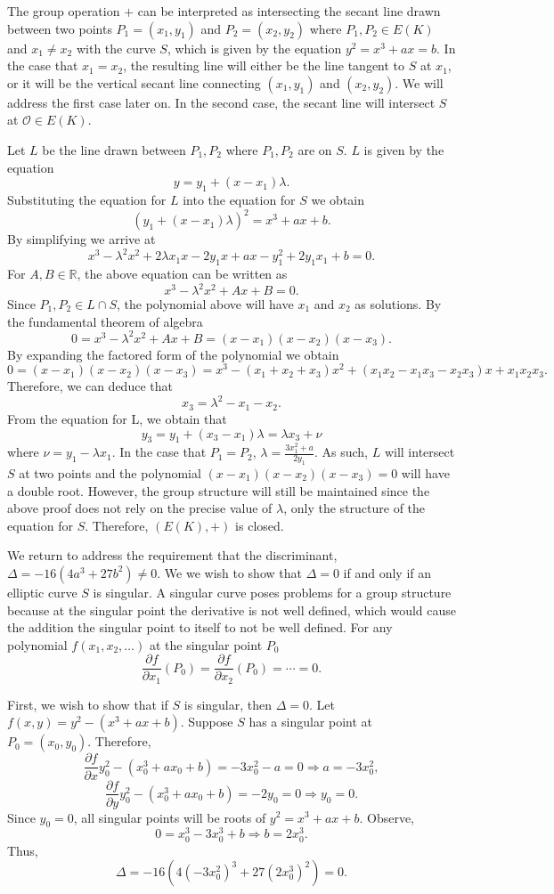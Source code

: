 \documentclass{article}
\begin{document}
\indent The group operation $+$ can be interpreted as intersecting the secant line drawn between two points $P_1=(x_1,y_1)$ and $P_2=(x_2,y_2)$ where $P_1,P_2 \in E(K)$ and $x_1 \neq x_2$ with the curve $S$, which is given by the equation $y^2=x^3+ax=b$. In the case that $x_1=x_2$, the resulting line will either be the line tangent to $S$ at $x_1$, or it will be the vertical secant line connecting $(x_1,y_1)$ and $(x_2,y_2)$. We will address the first case later on. In the second case, the secant line will intersect $S$ at $\mathcal{O} \in E(K)$.

\indent Let $L$ be the line drawn between $P_1,P_2$ where $P_1,P_2$ are on $S$. $L$ is given by the equation
$$y=y_1+(x-x_1)\lambda.$$
Substituting the equation for $L$ into the equation for $S$ we obtain
$$(y_1+(x-x_1)\lambda)^2=x^3+ax+b.$$
By simplifying we arrive at
$$x^3-\lambda^2 x^2+2\lambda x_1x-2y_1x+ax-y_1^2+2y_1x_1+b=0.$$
For $A,B\in\mathbb{R}$, the above equation can be written as
$$x^3-\lambda^2 x^2+Ax+B=0.$$
Since $P_1,P_2 \in L \cap S$, the polynomial above will have $x_1$ and $x_2$ as solutions. By the fundamental theorem of algebra
$$0=x^3-\lambda^2 x^2+Ax+B=(x-x_1)(x-x_2)(x-x_3).$$
By expanding the factored form of the polynomial we obtain
$$0=(x-x_1)(x-x_2)(x-x_3)=x^3-(x_1+x_2+x_3)x^2+(x_1x_2-x_1x_3-x_2x_3)x+x_1x_2x_3.$$
Therefore, we can deduce that
$$x_3=\lambda^2-x_1-x_2.$$
From the equation for L, we obtain that
$$y_3=y_1+(x_3-x_1)\lambda=\lambda x_3+\nu$$
where $\nu=y_1-\lambda x_1$. In the case that $P_1=P_2$, $\lambda=\frac{3x_1^2+a}{2y_1}$. As such, $L$ will intersect $S$ at two points and the polynomial $(x-x_1)(x-x_2)(x-x_3)=0$ will have a double root. However, the group structure will still be maintained since the above proof does not rely on the precise value of  $\lambda$, only the structure of the equation for $S$. Therefore, $(E(K),+)$ is closed.

\indent We return to address the requirement that the discriminant, $\Delta=-16(4a^3+27b^2) \neq 0$. We we wish to show that $\Delta=0$ if and only if an elliptic curve $S$ is singular. A singular curve poses problems for a group structure because at the singular point the derivative is not well defined, which would cause the addition the singular point to itself to not be well defined. For any polynomial $f(x_1,x_2,\dotsc)$ at the singular point $P_0$
$$\frac{\partial f}{\partial x_1}(P_0)=\frac{\partial f}{\partial x_2}(P_0)=\cdots=0.$$

\indent First, we wish to show that if $S$ is singular, then $\Delta=0$.
Let $f(x,y)=y^2-(x^3+ax+b)$. Suppose $S$ has a singular point at $P_0=(x_0, y_0)$. Therefore,
$$\frac{\partial f}{\partial x} y_0^2-(x_0^3+ax_0+b)=-3x_0^2-a=0 \Longrightarrow a=-3x_0^2,$$
$$\frac{\partial f}{\partial y} y_0^2-(x_0^3+ax_0+b)=-2y_0=0 \Longrightarrow y_0=0.$$
Since $y_0=0$, all singular points will be roots of $y^2=x^3+ax+b$. Observe,
$$0=x_0^3-3x_0^3+b \Longrightarrow b=2x_0^3.$$
Thus,
$$\Delta=-16(4(-3x_0^2)^3+27(2x_0^3)^2)=0.$$
\end{document}
